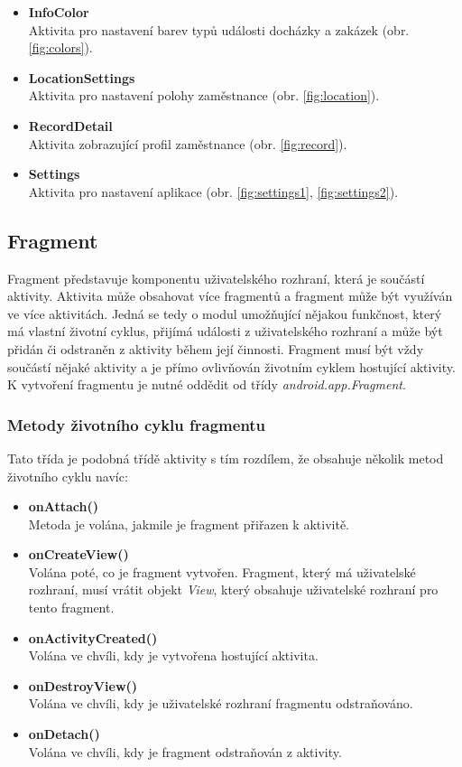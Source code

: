 \documentclass{diplomka}
\begin{document}
\begin{itemize}[noitemsep,nolistsep]
\item \textbf{InfoColor}\\
Aktivita pro nastavení barev typů události docházky a zakázek (obr. \ref{fig:colors}).
\item \textbf{LocationSettings}\\
Aktivita pro nastavení polohy zaměstnance (obr. \ref{fig:location}).
\item \textbf{RecordDetail}\\
Aktivita zobrazující profil zaměstnance (obr. \ref{fig:record}).
\item \textbf{Settings}\\
Aktivita pro nastavení aplikace (obr. \ref{fig:settings1}, \ref{fig:settings2}).
\end{itemize}

\subsection{Fragment}
Fragment představuje komponentu uživatelského rozhraní, která je součástí aktivity. Aktivita může obsahovat více fragmentů a fragment může být využíván ve více aktivitách. Jedná se tedy o modul umožňující nějakou funkčnost, který má vlastní životní cyklus, přijímá události z uživatelského rozhraní a může být přidán či odstraněn z aktivity během její činnosti. Fragment musí být vždy součástí nějaké aktivity a je přímo ovlivňován životním cyklem hostující aktivity.
K vytvoření fragmentu je nutné oddědit od třídy \emph{android.app.Fragment}. 

\subsubsection*{Metody životního cyklu fragmentu}
Tato třída je podobná třídě aktivity s tím rozdílem, že obsahuje několik metod životního cyklu navíc:
\begin{itemize}[]
\item \textbf{onAttach()}\\
Metoda je volána, jakmile je fragment přiřazen k aktivitě. 
\item \textbf{onCreateView()}\\
Volána poté, co je fragment vytvořen. Fragment, který má uživatelské rozhraní, musí vrátit objekt \emph{View}, který obsahuje uživatelské rozhraní pro tento fragment.
\item \textbf{onActivityCreated()}\\
Volána ve chvíli, kdy je vytvořena hostující aktivita.
\item \textbf{onDestroyView()}\\
Volána ve chvíli, kdy je uživatelské rozhraní fragmentu odstraňováno.
\item \textbf{onDetach()}\\
Volána ve chvíli, kdy je fragment odstraňován z aktivity.
\end{itemize}
\end{document}
